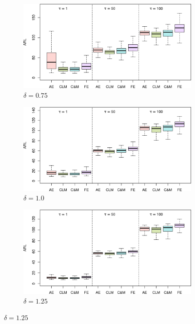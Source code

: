 \begin{figure}
\begin{subfigure}{0.49\textwidth}
\end{subfigure}
\begin{subfigure}{0.49\textwidth}
  \centering
  \caption{$ \delta = 0.75$}
  \label{fig:lambda=0.10/theta=4.0/delta=0.75}
  \includegraphics[width=\textwidth]{img/sims/theta=4.0_signedEWMA(l = 0.1, upw = true, L = 1.0)/delta=0.75.png}
\end{subfigure}
\begin{subfigure}{0.49\textwidth}
  \centering
  \caption{$ \delta = 1.0$}
  \label{fig:lambda=0.10/theta=4.0/delta=1.0}
  \includegraphics[width=\textwidth]{img/sims/theta=4.0_signedEWMA(l = 0.1, upw = true, L = 1.0)/delta=1.00.png}
\end{subfigure}
\begin{subfigure}{0.49\textwidth}
  \centering
  \caption{$ \delta = 1.25$}
  \label{fig:lambda=0.10/theta=4.0/delta=1.25}
  \includegraphics[width=\textwidth]{img/sims/theta=4.0_signedEWMA(l = 0.1, upw = true, L = 1.0)/delta=1.25.png}

\end{subfigure}
\end{figure}
